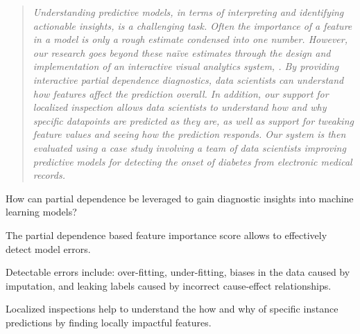 \begin{quote}\textit{
Understanding predictive models, in terms of interpreting and identifying actionable
insights, is a challenging task.
Often the importance of a feature in a model is only a rough estimate
condensed into one number.  However, our research goes beyond these na\"ive estimates through the design and implementation of an interactive visual analytics system,
\prospector. By providing interactive partial dependence diagnostics, data scientists can understand how features affect the prediction overall.  In addition, our support for localized inspection allows data scientists to understand how and why specific datapoints are predicted as they are, as well as support for  tweaking feature values and seeing how the prediction responds.  Our system is then evaluated using a case study involving a team of data scientists improving predictive models for detecting the onset of diabetes from electronic medical records.
}\end{quote}

\begin{contributions}{How can partial dependence be leveraged to gain diagnostic insights into machine learning models?}
\item The partial dependence based feature importance score allows to effectively detect model errors.
\item Detectable errors include: over-fitting, under-fitting, biases in the data caused by imputation, and leaking labels caused by incorrect cause-effect relationships.
\item Localized inspections help to understand the how and why of specific instance predictions by finding locally impactful features.
\end{contributions}

